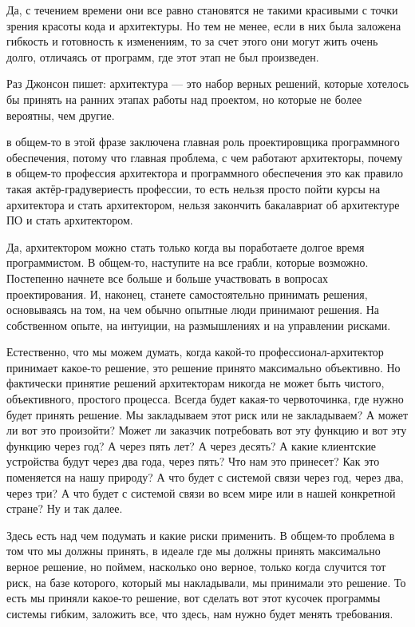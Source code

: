 Да, с течением времени они все равно становятся не такими красивыми с точки зрения красоты кода и архитектуры. Но тем не менее, если в них была заложена гибкость и готовность к изменениям, то за счет этого они могут жить очень долго, отличаясь от программ, где этот этап не был произведен.

Раз Джонсон пишет: архитектура ---  это набор верных решений, которые хотелось бы принять на ранних этапах работы над проектом, но которые не более вероятны, чем другие.

в общем-то в этой фразе заключена главная роль проектировщика программного обеспечения, потому что главная проблема, с чем работают архитекторы, почему в общем-то профессия архитектора и программного обеспечения это как правило такая актёр-градувериесть профессии, то есть нельзя просто пойти курсы на архитектора и стать архитектором, нельзя закончить бакалавриат об архитектуре ПО и стать архитектором.

Да, архитектором можно стать только когда вы поработаете долгое время программистом. В общем-то, наступите на все грабли, которые возможно. Постепенно начнете все больше и больше участвовать в вопросах проектирования. И, наконец, станете самостоятельно принимать решения, основываясь на том, на чем обычно опытные люди принимают решения. На собственном опыте, на интуиции, на размышлениях и на управлении рисками. 

Естественно, что мы можем думать, когда какой-то профессионал-архитектор принимает какое-то решение, это решение принято максимально объективно. Но фактически принятие решений архитекторам никогда не может быть чистого, объективного, простого процесса. Всегда будет какая-то червоточинка,
где нужно будет принять решение. Мы закладываем этот риск или не закладываем? А может ли вот это произойти? Может ли заказчик потребовать вот эту функцию и вот эту функцию через год? А через пять лет? А через десять? А какие клиентские устройства будут через два года, через пять? Что нам это принесет? Как это поменяется на нашу природу? А что будет с системой связи через год, через два, через три? А что будет с системой связи во всем мире или в нашей конкретной стране? Ну и так далее.

Здесь есть над чем подумать и какие риски применить. В общем-то проблема в том что мы должны принять, в идеале где мы должны принять максимально верное решение, но поймем, насколько оно верное, только когда случится тот риск, на базе которого, который мы накладывали, мы принимали это решение. То есть мы приняли какое-то решение, вот сделать вот этот кусочек программы системы гибким, заложить все, что здесь, нам нужно будет менять требования.

